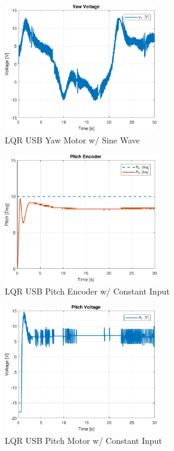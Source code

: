 \documentclass[fontsize=11pt, %
                             paper=letter, %
                             openany, %
                             captions=tableheading,
                             index=totoc,
                             hyperref]{labbook}
\begin{document}
\begin{addmargin}[0cm]{0cm}
\begin{figure}[H]
  \centering
  \includegraphics[width=0.6\textwidth]{figs/matlab/LQR_USB/Yaw_Volt_LQR_USB_SIN}
  \caption{LQR USB Yaw Motor w/ Sine Wave}
  \label{fig:Yaw_Volt_LQR_USB_SIN}
\end{figure}

\begin{figure}[H]
  \centering
  \includegraphics[width=0.6\textwidth]{figs/matlab/LQR_USB/Pitch_Pos_LQR_USB_CON}
  \caption{LQR USB Pitch Encoder w/ Constant Input}
  \label{fig:Pitch_Pos_LQR_USB_CON}
\end{figure}

\begin{figure}[H]
  \centering
  \includegraphics[width=0.6\textwidth]{figs/matlab/LQR_USB/Pitch_Volt_LQR_USB_CON}
  \caption{LQR USB Pitch Motor w/ Constant Input}
  \label{fig:Pitch_Volt_LQR_USB_CON}
\end{figure}


\end{addmargin}
\end{document}
